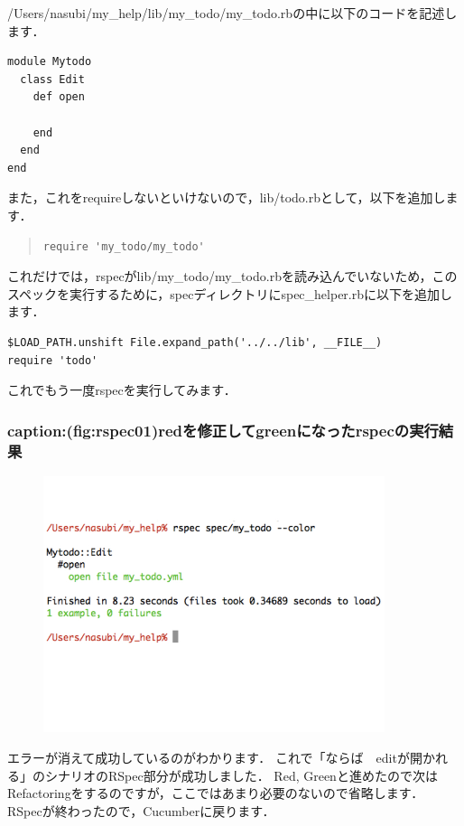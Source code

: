 /Users/nasubi/my\_help/lib/my\_todo/my\_todo.rbの中に以下のコードを記述します．
\begin{lstlisting}[style=customCsh]
module Mytodo
  class Edit
    def open

    end
  end
end
\end{lstlisting}
また，これをrequireしないといけないので，lib/todo.rbとして，以下を追加します．
\begin{quote}\begin{verbatim}
require 'my_todo/my_todo'
\end{verbatim}\end{quote}
これだけでは，rspecがlib/my\_todo/my\_todo.rbを読み込んでいないため，このスペックを実行するために，specディレクトリにspec\_helper.rbに以下を追加します．
\begin{lstlisting}[style=customCsh]
$LOAD_PATH.unshift File.expand_path('../../lib', __FILE__)
require 'todo'
\end{lstlisting}
これでもう一度rspecを実行してみます．

\subsubsection{caption:(fig:rspec01)redを修正してgreenになったrspecの実行結果}
\begin{figure}[htbp]\begin{center}
\includegraphics[width=10cm,bb= 0 0 737 553]{../figs/./rspec01.001.jpg}
\caption{}
\label{default}\end{center}\end{figure}
エラーが消えて成功しているのがわかります．
これで「ならば　editが開かれる」のシナリオのRSpec部分が成功しました．
Red, Greenと進めたので次はRefactoringをするのですが，ここではあまり必要のないので省略します．
RSpecが終わったので，Cucumberに戻ります．

